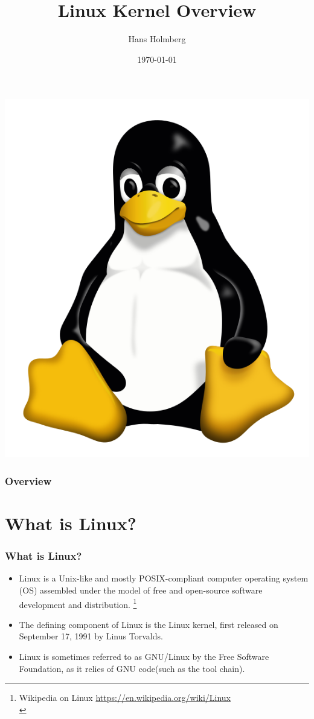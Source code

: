 \documentclass{beamer}
\title[TLKDCC Overview]{Linux Kernel Overview}
\author{Hans Holmberg}
\institute[LKTP]
{
Linux Kernel Teaching Project \\ 
\medskip
\textit{hans.holmberg@gmail.com}
}
\date{\today}
\begin{document}
\begin{frame}
\titlepage
\includegraphics{../common/tux} 
\end{frame}

\begin{frame}
\frametitle{Overview}
\tableofcontents 
\end{frame}

\section{What is Linux?} 

\begin{frame}
\frametitle{What is Linux?}
\begin{itemize}
	\item Linux is a Unix-like and mostly POSIX-compliant computer operating system (OS) assembled under the model of free and open-source software development and distribution. \footnote{Wikipedia on Linux \url{https://en.wikipedia.org/wiki/Linux}\\}
	\item The defining component of Linux is the Linux kernel, first released on September 17, 1991 by Linus Torvalds.
	\item Linux is sometimes referred to as GNU/Linux by the Free Software Foundation, as it relies of GNU code(such as the tool chain).
\end{itemize}
\end{frame}
\end{document}
